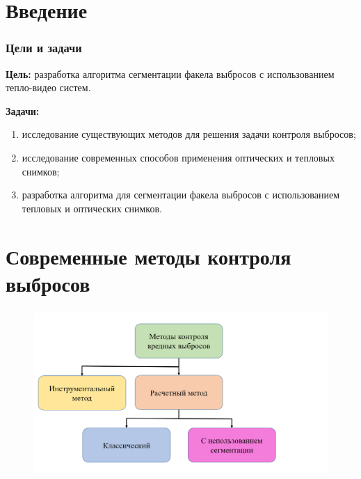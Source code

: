 \documentclass[t]{beamer}
\begin{document}
	
	\firstpage
	\justifying
\section{Введение}

	\begin{frame}
		\frametitle{Цели и задачи} 
		\textbf{Цель:} разработка алгоритма сегментации факела выбросов с использованием тепло-видео систем.
		
		\textbf{Задачи:}
		\begin{enumerate}
			\justifying
			\item исследование существующих методов для решения задачи контроля выбросов;
			\item исследование современных способов применения оптических и тепловых снимков;
			\item разработка алгоритма для сегментации факела выбросов с использованием тепловых и оптических снимков.
		\end{enumerate}
	\end{frame}

\section[Современные методы]{Современные методы контроля выбросов}
	\begin{frame}
		\frametitle{\insertsection} 
		\begin{figure}
			\centering
			\includegraphics[width = \textwidth]{image/scheme1}	
		\end{figure}
	\end{frame}
\end{document}
